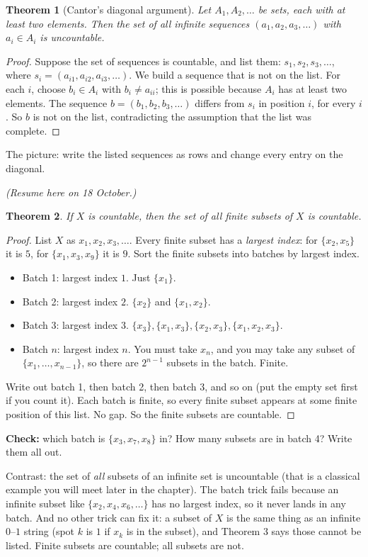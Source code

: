 \documentclass[11pt]{article}
\theoremstyle{plain}
\newtheorem{theorem}{Theorem}
\theoremstyle{definition}
\begin{document}
\begin{theorem}[Cantor's diagonal argument]
Let $A_1, A_2, \dots$ be sets, each with at least two elements. Then the set of all infinite sequences $(a_1, a_2, a_3, \dots)$ with $a_i \in A_i$ is uncountable.
\end{theorem}
\begin{proof}
Suppose the set of sequences is countable, and list them: $s_1, s_2, s_3, \dots$, where $s_i = (a_{i1}, a_{i2}, a_{i3}, \dots)$. We build a sequence that is not on the list. For each $i$, choose $b_i \in A_i$ with $b_i \ne a_{ii}$; this is possible because $A_i$ has at least two elements. The sequence $b = (b_1, b_2, b_3, \dots)$ differs from $s_i$ in position $i$, for every $i$. So $b$ is not on the list, contradicting the assumption that the list was complete.
\end{proof}
The picture: write the listed sequences as rows and change every entry on the diagonal.

\noindent\textit{(Resume here on 18 October.)}
\begin{theorem}
If $X$ is countable, then the set of all \emph{finite} subsets of $X$ is countable.
\end{theorem}
\begin{proof}
List $X$ as $x_1, x_2, x_3, \dots$. Every finite subset has a \emph{largest index}: for $\{x_2, x_5\}$ it is $5$, for $\{x_1, x_3, x_9\}$ it is $9$. Sort the finite subsets into batches by largest index.
\begin{itemize}
  \item Batch 1: largest index $1$. Just $\{x_1\}$.
  \item Batch 2: largest index $2$. $\{x_2\}$ and $\{x_1, x_2\}$.
  \item Batch 3: largest index $3$. $\{x_3\}, \{x_1, x_3\}, \{x_2, x_3\}, \{x_1, x_2, x_3\}$.
  \item Batch $n$: largest index $n$. You must take $x_n$, and you may take any subset of $\{x_1, \dots, x_{n-1}\}$, so there are $2^{n-1}$ subsets in the batch. Finite.
\end{itemize}
Write out batch 1, then batch 2, then batch 3, and so on (put the empty set first if you count it). Each batch is finite, so every finite subset appears at some finite position of this list. No gap. So the finite subsets are countable.
\end{proof}
\textbf{Check:} which batch is $\{x_3, x_7, x_8\}$ in? How many subsets are in batch 4? Write them all out.

Contrast: the set of \emph{all} subsets of an infinite set is uncountable (that is a classical example you will meet later in the chapter). The batch trick fails because an infinite subset like $\{x_2, x_4, x_6, \dots\}$ has no largest index, so it never lands in any batch. And no other trick can fix it: a subset of $X$ is the same thing as an infinite $0$--$1$ string (spot $k$ is $1$ if $x_k$ is in the subset), and Theorem 3 says those cannot be listed. Finite subsets are countable; all subsets are not.
\end{document}
